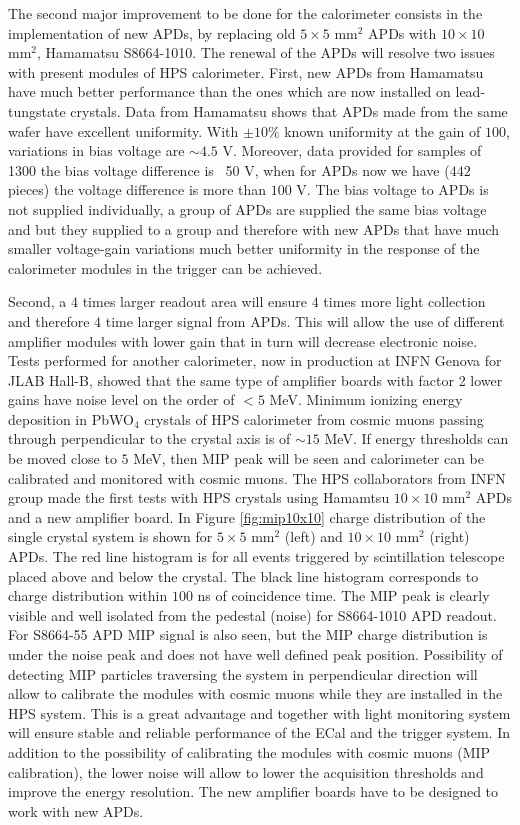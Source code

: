 The second major improvement to be done for the calorimeter consists in the implementation of new APDs, by replacing old $5\times 5$ mm$^2$ APDs with $10\times 10$ mm$^2$, Hamamatsu S8664-1010. The renewal of the APDs will resolve two issues with present modules of HPS calorimeter. First, new APDs from Hamamatsu have much better performance than the ones which are now installed on lead-tungstate crystals. Data from Hamamatsu shows that APDs made from the same wafer have excellent uniformity. With $\pm 10\%$ known uniformity at the gain of $100$, variations in bias voltage are $\sim 4.5$ V. Moreover, data provided for samples of 1300 the bias voltage difference is ~50 V, when for APDs now we have ($442$ pieces) the voltage difference is more than $100$ V. The bias voltage to APDs is not supplied individually, a group of APDs are supplied the same bias voltage and but they supplied to a group and therefore with new APDs that have much smaller voltage-gain variations much better uniformity in the response of the calorimeter modules in the trigger can be achieved. 

Second, a $4$ times larger readout area will ensure $4$ times more light collection and therefore $4$ time larger signal from APDs. This will allow the use of different amplifier modules with lower gain that in turn will decrease electronic noise. Tests performed for another calorimeter, now in production at INFN Genova for JLAB Hall-B, showed that the same type of amplifier boards with factor 2 lower gains have noise level on the order of $<5$ MeV. Minimum ionizing energy deposition in PbWO$_4$ crystals of HPS calorimeter from cosmic muons passing through perpendicular to the crystal axis is of $\sim 15$ MeV. If energy thresholds can be moved close to $5$ MeV, then MIP peak will be seen and calorimeter can be calibrated and monitored with cosmic muons. The HPS collaborators from INFN group made the first tests with HPS crystals using Hamamtsu $10\times 10$ mm$^2$ APDs and a new amplifier board. In Figure \ref{fig:mip10x10} charge distribution of the single crystal system is shown for $5\times 5$ mm$^2$ (left) and $10\times 10$ mm$^2$ (right) APDs. The red line histogram is for all events triggered by scintillation telescope placed above and below the crystal. The black line histogram corresponds to charge distribution within $100$ ns of coincidence time. The MIP peak is clearly visible and well isolated from the pedestal (noise) for S8664-1010 APD readout. For  S8664-55 APD MIP signal is also seen, but the MIP charge distribution is under the noise peak and does not have well defined peak position. Possibility of detecting MIP particles traversing the system in perpendicular direction will allow to calibrate the modules with cosmic muons while they are installed in the HPS system. This is a great advantage and together with light monitoring system will ensure stable and reliable performance of the ECal and the trigger system. In addition to the possibility of calibrating the modules with cosmic muons (MIP calibration), the lower noise will allow to lower the acquisition thresholds and improve the energy resolution. The new amplifier boards have to be designed to work with new APDs. 

